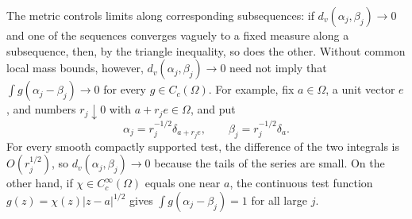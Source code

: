 The metric controls limits along corresponding subsequences: if $d_v(\alpha_j,\beta_j)\to0$ and one of the sequences converges vaguely to a fixed measure along a subsequence, then, by the triangle inequality, so does the other. Without common local mass bounds, however, $d_v(\alpha_j,\beta_j)\to0$ need not imply that $\int g(\alpha_j-\beta_j)\to0$ for every $g\in C_c(\Omega)$. For example, fix $a\in\Omega$, a unit vector $e$, and numbers $r_j\downarrow0$ with $a+r_je\in\Omega$, and put
\[
 \alpha_j=r_j^{-1/2}\delta_{a+r_je},\qquad
 \beta_j=r_j^{-1/2}\delta_a.
\]
For every smooth compactly supported test, the difference of the two integrals is $O(r_j^{1/2})$, so $d_v(\alpha_j,\beta_j)\to0$ because the tails of the series are small. On the other hand, if $\chi\in C_c^\infty(\Omega)$ equals one near $a$, the continuous test function $g(z)=\chi(z)|z-a|^{1/2}$ gives $\int g(\alpha_j-\beta_j)=1$ for all large $j$.

